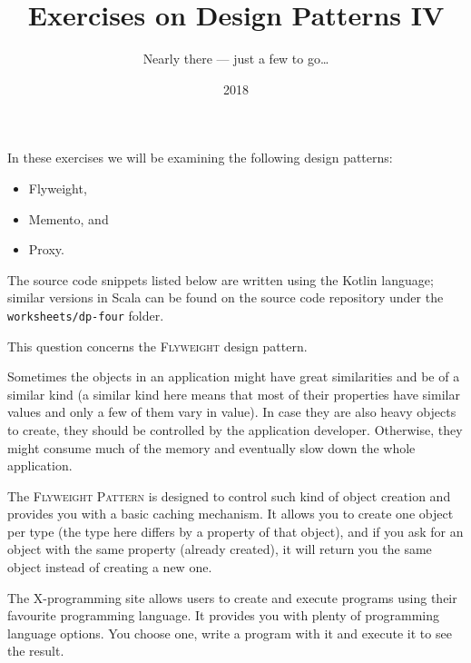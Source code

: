 \documentclass[12pt,a4paper]{exam}
\title{Exercises on Design Patterns IV}
\author{Nearly there --- just a few to go\ldots}
\date{2018}
\begin{document}
\maketitle

In these exercises we will be examining the following design patterns:
\begin{itemize}
\item Flyweight, 
\item Memento, and
\item Proxy.
\end{itemize}
The source code snippets listed below are written using the Kotlin language; 
similar versions in Scala can be found on the source 
code repository under the \verb!worksheets/dp-four! folder. 

\begin{questions}

\question
This question concerns the \textsc{Flyweight} design pattern.

Sometimes the objects in an application might have great similarities and be of a similar kind 
(a similar kind here means that most of their properties have similar values and only a few of 
them vary in value). In case they are also heavy objects to create, they should be controlled by 
the application developer. Otherwise, they might consume much of the memory and eventually slow 
down the whole application.

The \textsc{Flyweight Pattern} is designed to control such kind of object creation and 
provides you 
with a basic caching mechanism. It allows you to create one object per type (the type here 
differs by a property of that object), and if you ask for an object with the same property 
(already created), it will return you the same object instead of creating a new one.

The X-programming site allows users to create and execute programs using their favourite
programming language. It provides you with plenty of programming language options. You choose 
one, write a program with it and execute it to see the result.


\end{questions}
\end{document}
